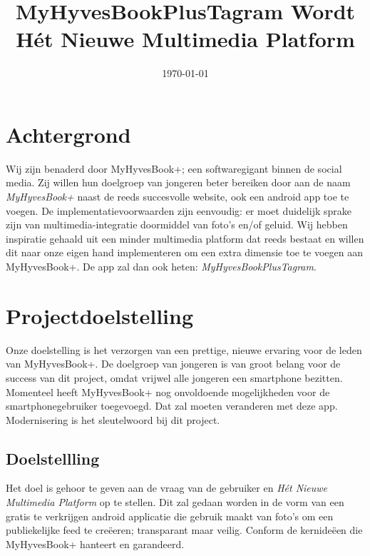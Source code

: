 \documentclass{uva-inf-article}
\title{MyHyvesBookPlusTagram Wordt H\'et Nieuwe Multimedia Platform}
\date{\today}
\begin{document}
\maketitle


\tableofcontents


\section{Achtergrond}
Wij zijn benaderd door MyHyvesBook+; een softwaregigant binnen de social media. Zij willen hun doelgroep van jongeren beter bereiken door aan de naam \textit{MyHyvesBook+} naast de reeds succesvolle website, ook een android app toe te voegen. De implementatievoorwaarden zijn eenvoudig: er moet duidelijk sprake zijn van multimedia-integratie doormiddel van foto's en/of geluid.
Wij hebben inspiratie gehaald uit een minder multimedia platform dat reeds bestaat en willen dit naar onze eigen hand implementeren om een extra dimensie toe te voegen aan MyHyvesBook+. De app zal dan ook heten: \textit{MyHyvesBookPlusTagram}.


\section{Projectdoelstelling}
Onze doelstelling is het verzorgen van een prettige, nieuwe ervaring voor de leden van MyHyvesBook+. De doelgroep van jongeren is van groot belang voor de success van dit project, omdat vrijwel alle jongeren een smartphone bezitten. Momenteel heeft MyHyvesBook+ nog onvoldoende mogelijkheden voor de smartphonegebruiker toegevoegd. Dat zal moeten veranderen met deze app. Modernisering is het sleutelwoord bij dit project.

\subsection{Doelstellling}
Het doel is gehoor te geven aan de vraag van de gebruiker en \textit{H\'et Nieuwe Multimedia Platform} op te stellen. Dit zal gedaan worden in de vorm van een gratis te verkrijgen android applicatie die gebruik maakt van foto's om een publiekelijke feed te cre\"eeren; transparant maar veilig. Conform de kernide\"een die MyHyvesBook+ hanteert en garandeerd.
\end{document}
